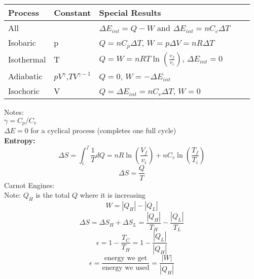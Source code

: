 \documentclass[11pt]{article}
\begin{document}
        \begin{table}[h]
            \centering
            \renewcommand{\arraystretch}{1.5}
            \begin{tabular}{lp{3cm}lp{6cm}l}
                \toprule
                \textbf{Process} & \textbf{Constant} & \textbf{Special Results} \\
                \midrule
                All & &  $\Delta E_{int} = Q - W$ and $\Delta E_{int} = n C_v \Delta T$\\
                Isobaric  & p  & $Q = nC_p \Delta T$, $W = p \Delta V = nR \Delta T$\\
                Isothermal & T  & $Q = W = nRT \ln (\frac{v_f}{v_i}) $, $\Delta E_{int} = 0$ \\
                Adiabatic & $pV^{\gamma}$,$TV^{\gamma - 1}$ & $Q = 0$, $W = - \Delta E_{int} $ \\
                Isochoric & V  & $Q = \Delta E_{int} = n C_v \Delta T$, $W = 0$ \\
                \bottomrule
            \end{tabular}
        \end{table}
    \noindent Notes:
    \\ $\gamma = C_p/C_v$
    \\ $\Delta E = 0$ for a cyclical process (completes one full cycle)
    \\ \textbf{Entropy:}
    \begin{equation}
        \Delta S = \int_{i}^f \frac{1}{T} dQ =  nR\ln (\frac{V_f}{v_i}) + nC_v \ln (\frac{T_f}{T_i}) \tag{all processes}
    \end{equation}
    \begin{equation}
        \Delta S = \frac{Q}{T} \tag{isothermal process}
    \end{equation}
    Carnot Engines:
    \\ \noindent Note: $Q_H$ is the total $Q$ where it is increasing
    \begin{equation}
        W = |Q_H| - |Q_L| \tag{Carnot engine work}
    \end{equation}
    \begin{equation}
                       \Delta S = \Delta S_H + \Delta S_L = \frac{|Q_H|}{T_H} - \frac{|Q_L|}{T_L} \tag{entropy, carnot engine}
    \end{equation}
    \begin{equation}
        \epsilon = 1 - \frac{T_C}{T_H} = 1 - \frac{|Q_L|}{|Q_H|} \tag{carnot efficiency}
    \end{equation}
    \begin{equation}
        \epsilon = \frac{\text{energy we get}}{\text{energy we used}} = \frac{|W|}{|Q_H|} \tag{efficiency, all engines}
    \end{equation}
\end{document}
